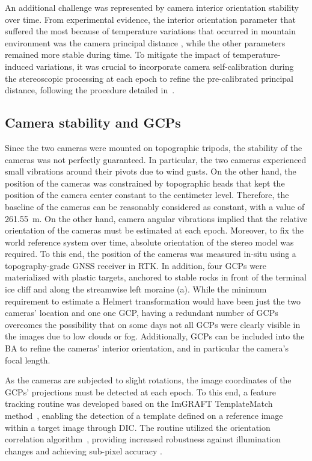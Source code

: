 An additional challenge was represented by camera interior orientation stability over
time.
From experimental evidence, the interior orientation parameter that suffered the most
because of temperature variations that occurred in mountain environment
was the camera principal distance \citep{Elias2020}, while the other parameters
remained more stable during time.
To mitigate the impact of temperature-induced variations, it was crucial to incorporate
camera self-calibration during the stereoscopic processing at each epoch to refine the
pre-calibrated principal distance, following the procedure detailed
in~.

\subsection{Camera stability and GCPs}\label{sec:stability}

Since the two cameras were mounted on topographic tripods, the stability of the cameras
was not perfectly guaranteed. In particular, the two cameras experienced small vibrations
around their pivots due to wind gusts.
On the other hand, the position of the cameras was constrained by topographic heads that
kept the position of the camera center constant to the centimeter level.
Therefore, the baseline of the cameras can be reasonably considered as constant, with a
value of \SI{261.55}{\meter}.
On the other hand, camera angular vibrations implied that the relative orientation of the
cameras must be estimated at each epoch.
Moreover, to fix the world reference system over time, absolute orientation of the
stereo model was required.
To this end, the position of the cameras was measured in-situ using a topography-grade
GNSS receiver in RTK.
In addition, four GCPs were materialized with plastic targets, anchored to stable rocks
in front of the terminal ice cliff and along the streamwise left
moraine (a).
While the minimum requirement to estimate a Helmert transformation would have been just
the two cameras' location and one one GCP, having a redundant number of GCPs overcomes
the
possibility that on some days not all GCPs were clearly visible in the images due to low
clouds or fog.
Additionally, GCPs can be included into the BA to refine the cameras' interior
orientation,
and in particular the camera's focal length.

As the cameras are subjected to slight rotations, the image coordinates of the GCPs'
projections must be detected at each epoch.
To this end, a feature tracking routine was developed based on the ImGRAFT TemplateMatch
method~\citep{Messerli2015}, enabling the detection of a template defined on a reference
image within a target image through DIC.
The routine utilized the orientation correlation algorithm~\citep{fitch2002_OC},
providing increased
robustness against illumination changes and achieving sub-pixel accuracy
\citep{Dematteis2021,Heid2012_evaluation_xcorr}.



